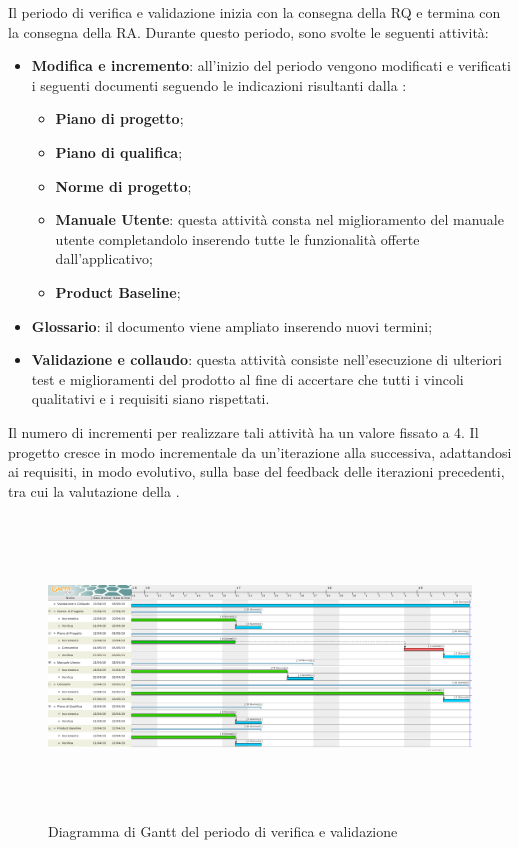 Il periodo di verifica e validazione inizia con la consegna della RQ e termina con la consegna della RA.\newline
Durante questo periodo, sono svolte le seguenti attività:
\begin{itemize}
	\item \textbf{Modifica e incremento}: all'inizio  del  periodo  vengono  modificati  e  verificati  i seguenti documenti seguendo le indicazioni risultanti dalla \RQ{}:
	\begin{itemize}
		\item \textbf{Piano di progetto};
		\item \textbf{Piano di qualifica};
		\item \textbf{Norme di progetto};
		\item \textbf{Manuale Utente}: questa attività consta nel miglioramento del manuale utente completandolo inserendo tutte le funzionalità offerte dall'applicativo;
		\item \textbf{Product Baseline};
	\end{itemize}
	\item \textbf{Glossario}: il documento viene ampliato inserendo nuovi termini;
	\item \textbf{Validazione e collaudo}: questa attività consiste nell'esecuzione di ulteriori test e miglioramenti del prodotto al fine di accertare che tutti i vincoli qualitativi e i requisiti siano rispettati.
\end{itemize}
Il numero di incrementi per realizzare tali attività ha un valore fissato a 4.
Il progetto cresce in modo incrementale da un'iterazione alla successiva, adattandosi ai requisiti, in modo evolutivo, sulla base del feedback delle iterazioni precedenti, tra cui la valutazione della \RQ{}.
\begin{figure}[H]
		\hspace*{-1.5cm}
	\includegraphics[width=19.4cm, height=8cm]{Pianificazione/verificaValidazione.pdf}
	\caption{Diagramma di Gantt del periodo di verifica e validazione}
\end{figure}